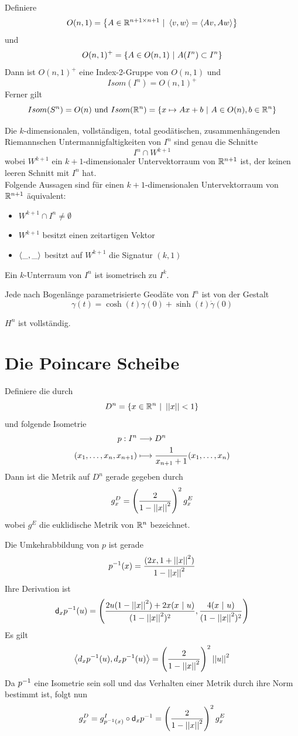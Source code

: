 \documentclass{book}
\renewcommand{\d}{\textsf{d}}
\begin{document}
\Lem{}
Definiere
\[ O(n,1) = \set{A \in \R^{n+1\times n + 1}}{ \shrp{v,w} = \shrp{Av, Aw} }\]
und
\[ O(n,1)^+ = \set{A \in O(n,1)}{A (I^n) \subset I^n } \]
Dann ist $O(n,1)^+$ eine Index-2-Gruppe von $O(n,1)$ und
\[ Isom(I^n) = O(n,1)^+ \]
Ferner gilt
\[ Isom(S^n) = O(n) \text{ und } Isom(\R^n) = \set{x\mapsto Ax + b}{A \in O(n), b\in \R^n } \]


\Prop{}
Die $k$-dimensionalen, vollständigen, total geodätischen, zusammenhängenden Riemannschen Untermannigfaltigkeiten von $I^n$ sind genau die Schnitte
\[ I^n \cap W^{k+1}\]
wobei $W^{k+1}$ ein $k+1$-dimensionaler Untervektorraum von $\mathbb{R}^{n+1}$ ist, der keinen leeren Schnitt mit $I^n$ hat.\\
Folgende Aussagen sind für einen $k+1$-dimensionalen Untervektorraum von $\mathbb{R}^{n+1}$ äquivalent:
\begin{itemize}
	\item $W^{k+1}\cap I^n \neq \emptyset$
	\item $W^{k+1}$ besitzt einen zeitartigen Vektor
	\item $\left<\_,\_\right>$ besitzt auf $W^{k+1}$ die Signatur $(k,1)$
\end{itemize}

\Bem{}
Ein $k$-Unterraum von $I^n$ ist isometrisch zu $I^k$.

\Prop{}
Jede nach Bogenlänge parametrisierte Geodäte von $I^n$ ist von der Gestalt
\[ \gamma(t) = \cosh(t) \gamma(0) + \sinh(t)\dot{\gamma}(0) \]

\Kor{}
$H^n$ ist vollständig.

\section{Die Poincare Scheibe}
Definiere die  durch
\[D^n = \set{x \in \R^n}{\norm{x} < 1} \]
und folgende Isometrie
\begin{align*}
p : I^n & \overset{}{\longrightarrow} D^n\\
(x_1, \ldots, x_n, x_{n+1}) & \longmapsto \frac{1}{x_{n+1} + 1} (x_1,\ldots, x_n) 
\end{align*}
Dann ist die Metrik auf $D^n$ gerade gegeben durch
\[ g^D_x = \left(\frac{2}{1 - \left|\left|x\right|\right|^2}\right)^2g^E_x \]
wobei $g^E$ die euklidische Metrik von $\mathbb{R}^n$ bezeichnet.
\begin{Beweis}{}
	Die Umkehrabbildung von $p$ ist gerade
	\[ p^{-1}(x) = \frac{(2x, 1 + \left|\left|x\right|\right|^2)}{1 - \left|\left|x\right|\right|^2} \]
	Ihre Derivation ist
	\[ \d_xp\i(u) =  \klam{ \frac{ 2 u (1 - \norm{x}^2) + 2 x(x~|~u)}{ (1 - \norm{x}^2)^2 } , \frac{ 4  (x~|~u) }{ (1 - \norm{x}^2)^2 }} \]
	Es gilt
	\[ \left<d_xp^{-1}(u), d_xp^{-1}(u)\right> = \left(\frac{2}{1 - \left|\left|x\right|\right|^2}\right)^2 \left|\left|u\right|\right|^2 \]
	Da $p^{-1}$ eine Isometrie sein soll und das Verhalten einer Metrik durch ihre Norm bestimmt ist, folgt nun
	\[ g^D_x = g^I_{p\i(x)} \circ \d_xp\i  = \klam{\frac{2}{1 - \norm{x}^2}}^2g^E_x \]
\end{Beweis}
\end{document}
